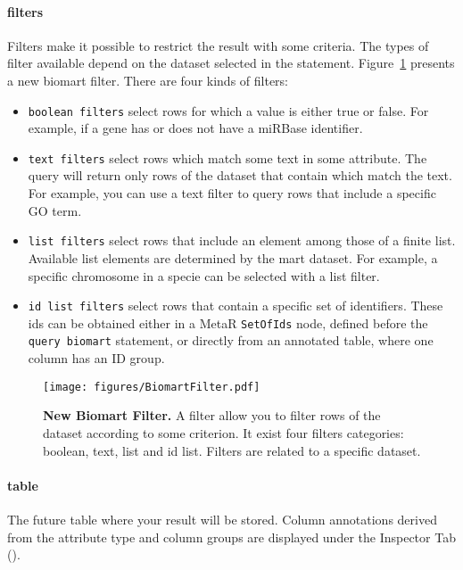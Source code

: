 \paragraph{filters}
Filters make it possible to restrict the result with some criteria. The types of filter available depend on the dataset selected in the statement. Figure~\ref{fig:BiomartFilter} presents a new biomart filter. There are four kinds of filters: 
\begin{itemize}

\item \texttt{boolean filters} select rows for which a value is either true or false. For example, if a gene has or does not have a miRBase identifier.
\item \texttt{text filters} select rows which match some text in some attribute. The query will return only rows of the dataset that contain which match the text. For example, you can use a text filter to query rows that include a specific GO term.
\item \texttt{list filters} select rows that include an element among those of a finite list. Available list elements are determined by the mart dataset.  For example, a specific chromosome in a specie can be selected with a list filter.
\item \texttt{id list filters} select rows that contain a specific set of identifiers. These ids can be obtained either in a MetaR \texttt{SetOfIds} node, defined before the \texttt{query biomart} statement, or directly from an annotated table, where one column has an ID group.  

\end{itemize}

 \begin{figure}[h!tbp]
  \centering
  \texttt{[image: figures/BiomartFilter.pdf]}
\caption[New Biomart Filter]{\textbf{New Biomart Filter.} A filter allow you to filter rows of the dataset according to some criterion. It exist four filters categories: boolean, text, list and id list. Filters are related to a specific dataset.}
\label{fig:BiomartFilter}
\end{figure}

\paragraph{table}
The future table where your result will be stored. Column annotations derived from the attribute type and column groups are displayed under the Inspector Tab (\inspectorTabIcon).
